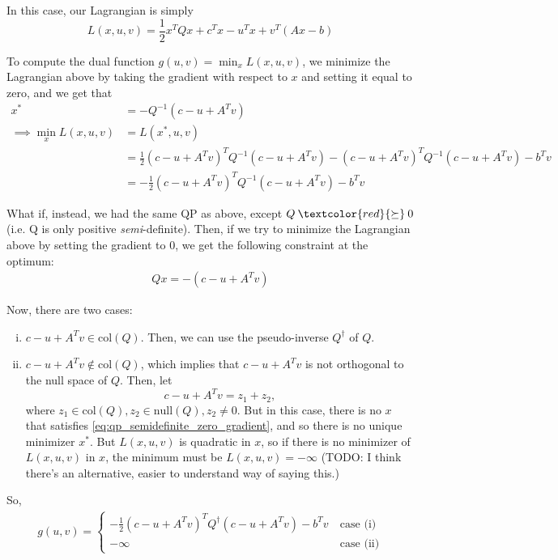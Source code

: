 \documentclass[11pt]{article}
\begin{document}
In this case, our Lagrangian is simply
\[ L(x, u, v) = \frac{1}{2} x^T Q x + c^T x - u^T x + v^T(Ax - b) \]

To compute the dual function $g(u, v) = \min_x L(x, u, v)$, we minimize the
Lagrangian above by taking the gradient with respect to $x$ and setting it equal
to zero, and we get that
\begin{align*}
x^* &= -Q^{-1}(c - u + A^T v) \\
\implies \min_x L(x, u, v) &= L(x^*, u, v) \\
    &= \frac{1}{2} (c - u + A^T v)^T Q^{-1}(c - u + A^T v) - (c - u + A^T v)^T Q^{-1}(c - u + A^T v) - b^T v \\
    &= -\frac{1}{2} (c - u + A^T v)^T Q^{-1}(c - u + A^T v) - b^T v
\end{align*}

What if, instead, we had the same QP as above, except $Q
\mathbin{\textcolor{red}{\succeq}} 0$ (i.e. Q is only positive
\textit{semi}-definite).  Then, if we try to minimize the Lagrangian above by
setting the gradient to 0, we get the following constraint at the optimum:
\begin{align}
Qx = -(c - u + A^T v) \label{eq:qp_semidefinite_zero_gradient}
\end{align}

Now, there are two cases:
\begin{enumerate}[(i)]
\item $c - u + A^T v \in \text{col}(Q)$. Then, we can use the pseudo-inverse
      $Q^{\dagger}$ of $Q$.
\item $c - u + A^T v \not\in \text{col}(Q)$, which implies that $c - u + A^T v$
      is not orthogonal to the null space of $Q$. Then, let
      \[ c - u + A^T v = z_1 + z_2, \]
      where $z_1 \in \text{col}(Q), z_2 \in \text{null}(Q), z_2 \neq 0$. But
      in this case, there is no $x$ that satisfies
      \cref{eq:qp_semidefinite_zero_gradient}, and so there is no unique
      minimizer $x^*$. But $L(x, u, v)$ is quadratic in $x$, so if there is no
      minimizer of $L(x, u, v)$ in $x$, the minimum must be $L(x, u, v) =
      -\infty$ (TODO: I think there's an alternative, easier to understand way
      of saying this.)
\end{enumerate}

So,
\begin{align*}
g(u, v) = \begin{cases}
-\frac{1}{2} (c - u + A^T v)^T Q^{\dagger} (c - u + A^Tv) - b^T v ~&\text{case (i)} \\
-\infty ~&\text{case (ii)}
\end{cases}
\end{align*}
\end{document}
